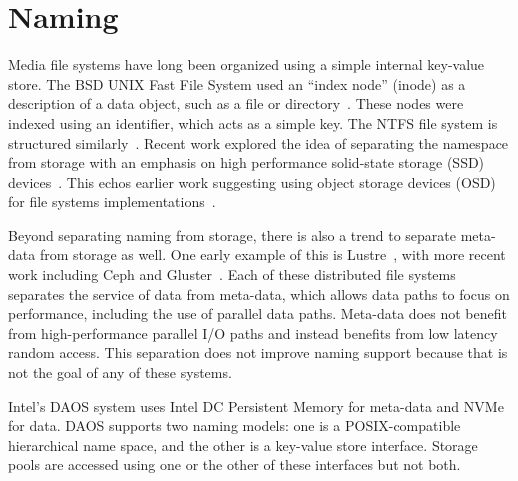 
\section{Naming}
\label{ch:background:sec:naming}


Media file systems have long been organized using a simple internal key-value
store.  The BSD UNIX Fast File System used an ``index node'' (inode) as a
description of a data object, such as a file or directory~\cite{mckusick1984a}.  These nodes were
indexed using an identifier, which acts as a simple key.  The NTFS file system
is structured similarly~\cite{custer1994inside}.  Recent work explored the idea
of separating the namespace from storage with an emphasis on high performance
solid-state storage (SSD) devices~\cite{koo2021modernizing}.  This echos earlier
work suggesting using object storage devices (OSD) for file systems
implementations~\cite{seltzer2009hierarchical}.

Beyond separating naming from storage, there is also a trend to separate
meta-data from storage as well.  One early example of this is
Lustre~\cite{braam2019lustre}, with more recent work including Ceph and
Gluster~\cite{noronha2008imca,weil2006ceph}.  Each of these distributed file
systems separates the service of data from meta-data, which allows data paths to
focus on performance, including the use of parallel data paths.  Meta-data does
not benefit from high-performance parallel I/O paths and instead benefits from
low latency random access. This separation does not improve naming support
because that is not the goal of any of these systems.

Intel's DAOS system uses Intel DC Persistent Memory for meta-data and \ac{NVMe}
for data. DAOS supports two naming models: one is a POSIX-compatible
hierarchical name space, and the other is a key-value store interface. Storage
pools are accessed using one or the other of these interfaces but not both.

